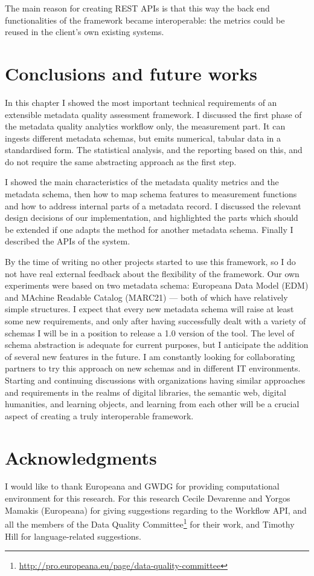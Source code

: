 The main reason for creating REST APIs is that this way the back end functionalities of the framework became interoperable: the metrics could be reused in the client's own existing systems.

\section{Conclusions and future works}

In this chapter I showed the most important technical requirements of an extensible metadata quality assessment framework. I discussed the first phase of the metadata quality analytics workflow only, the measurement part. It can ingests different metadata schemas, but emits numerical, tabular data in a standardised form. The statistical analysis, and the reporting based on this, and do not require the same abstracting approach as the first step.

I showed the main characteristics of the metadata quality metrics and the metadata schema, then how to map schema features to measurement functions and how to address internal parts of a metadata record. I discussed the relevant design decisions of our implementation, and highlighted the parts which should be extended if one adapts the method for another metadata schema. Finally I described the APIs of the system.

By the time of writing no other projects started to use this framework, so I do not have real external feedback about the flexibility of the framework. Our own experiments were based on two metadata schema: Europeana Data Model (EDM) and MAchine Readable Catalog (MARC21) --- both of which have relatively simple structures. I expect that every new metadata schema will raise at least some new requirements, and only after having successfully dealt with a variety of schemas I will be in a position to release a 1.0 version of the tool. The level of schema abstraction is adequate for current purposes, but I anticipate the addition of several new features in the future. I am constantly looking for collaborating partners to try this approach on new schemas and in different IT environments. Starting and continuing discussions with organizations having similar approaches and requirements in the realms of digital libraries, the semantic web, digital humanities, and learning objects, and learning from each other will be a crucial aspect of creating a truly interoperable framework.

\section{Acknowledgments}
I would like to thank Europeana and GWDG for providing computational environment for this research. For this research Cecile Devarenne and Yorgos Mamakis (Europeana) for giving suggestions regarding to the Workflow API, and all the members of the Data Quality Committee\footnote{\url{http://pro.europeana.eu/page/data-quality-committee}} for their work, and Timothy Hill for language-related suggestions.

% 
% 
